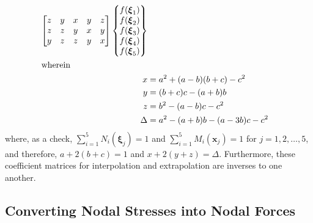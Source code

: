 \begin{subequations}
\begin{align}
\begin{bmatrix}
    z & y & x & y & z \\
    z & z & y & x & y \\
    y & z & z & y & x
    \end{bmatrix} \left\{ \begin{matrix}
    f ( \boldsymbol{\xi}_1 ) \\ 
    f ( \boldsymbol{\xi}_2 ) \\ 
    f ( \boldsymbol{\xi}_3 ) \\ 
    f ( \boldsymbol{\xi}_4 ) \\ 
    f ( \boldsymbol{\xi}_5 )
    \end{matrix} \right\}  \\
    \intertext{wherein}
    x & = a^2 + (a-b)(b+c) - c^2 \\
    y & = (b+c)c - (a+b)b \\
    z & = b^2 - (a-b)c - c^2 \\
    \Delta & = a^2 - (a+b)b - (a-3b)c - c^2
    \end{align}
\end{subequations}
where, as a check, $\sum_{i=1}^5 N_i (\boldsymbol{\xi}_j) = 1$ and $\sum_{i=1}^5 M_i (\boldsymbol{x}_j) = 1$ for $j=1,2,\ldots,5$, and therefore, $a + 2(b + c) = 1$ and $x + 2(y + z) = \Delta$.  Furthermore, these coefficient matrices for interpolation and extrapolation are inverses to one another.  


\subsection{Converting Nodal Stresses into Nodal Forces}



